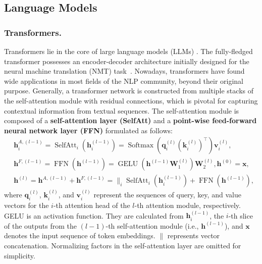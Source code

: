 \documentclass[acmsmall, screen]{acmart}
\begin{document}
\subsection{Language Models}

\subsubsection{\textbf{Transformers.}}
\label{sec:transformer} 
Transformers lie in the core of large language models (LLMs) \cite{vaswani2017attention,devlin2018bert,reimers2019sentence}. The fully-fledged transformer possesses an encoder-decoder architecture initially designed for the neural machine translation (NMT) task~\cite{stahlberg2020neural}. Nowadays, transformers have found wide applications in most fields of the NLP community, beyond their original purpose. Generally, a transformer network is constructed from multiple stacks of the self-attention module with residual connections, which is pivotal for capturing contextual information from textual sequences. The self-attention module is composed of a \textbf{self-attention layer (SelfAtt)} and a \textbf{point-wise feed-forward neural network layer (FFN)} formulated as follows:
\begin{equation}
\label{eq:transformer}
\begin{aligned}
& \mathbf{h}^{A, (l-1)}_{i} = \operatorname{SelfAtt}_i\left(\mathbf{h}^{(l-1)}_{i}\right)  =\operatorname{Softmax}\left(\mathbf{q}^{(l)}_{i} \left(\mathbf{k}^{(l)}_i\right)^\top\right) \mathbf{v}_{i}^{(l)}, \\
& \mathbf{h}^{F, (l-1)} = \operatorname{FFN}\left(\mathbf{h}^{(l-1)}\right)  =\operatorname{GELU}\left(\mathbf{h}^{(l-1)} \mathbf{W}^{(l)}_1\right) \mathbf{W}^{(l)}_2, \mathbf{h}^{(0)}=\mathbf{x}, \\
& \mathbf{h}^{(l)} = \mathbf{h}^{A, (l-1)} + \mathbf{h}^{F, (l-1)} =  \big \|_{i} \operatorname{SelfAtt}_i \left(\mathbf{h}^{(l-1)}_{i} \right) + \operatorname{FFN} \left(\mathbf{h}^{(l-1)} \right),
\end{aligned}
\end{equation}
where $\mathbf{q}^{(l)}_i$, $\mathbf{k}^{(l)}_{i}$, and $\mathbf{v}^{(l)}_{i}$ represent the sequences of query, key, and value vectors for the $i$-th attention head of the $l$-th attention module, respectively. GELU is an activation function. They are calculated from $\mathbf{h}^{(l-1)}_{i}$, the $i$-th slice of the outputs from the $(l-1)$-th self-attention module (i.e., $\mathbf{h}^{(l-1)}$), and $\mathbf{x}$ denotes the input sequence of token embeddings. $\|$ represents vector concatenation. Normalizing factors in the self-attention layer are omitted for simplicity. 
\end{document}
